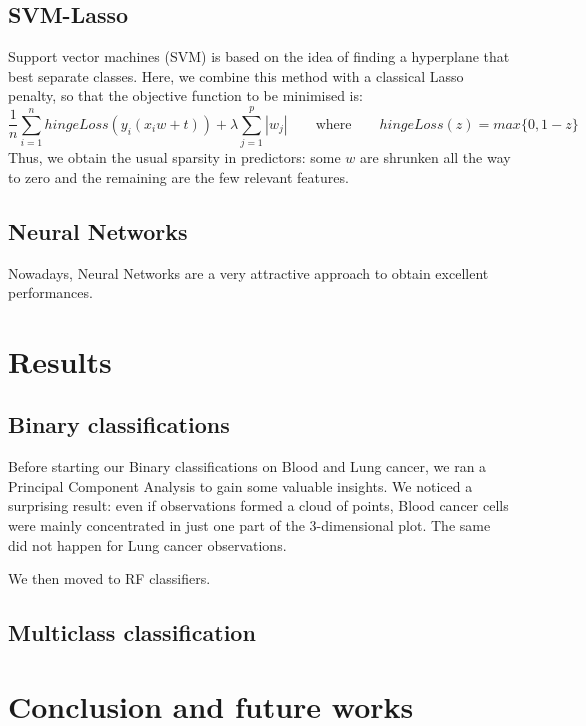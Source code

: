 \documentclass[a4paper,11pt, oneside]{article}  %
\begin{document}
\subsection{SVM-Lasso}
Support vector machines (SVM) is based on the idea of finding a hyperplane that best separate classes. Here, we combine this method with a classical Lasso penalty, so that the objective function to be minimised is:
\begin{equation*}
	\dfrac{1}{n} \sum_{i=1}^n hingeLoss(y_i(x_i w + t)) + \lambda \sum_{j=1}^p |w_j|  \qquad	\text{where} \qquad  hingeLoss(z) = max\{0, 1-z\}
\end{equation*}
Thus, we obtain the usual sparsity in predictors: some $w$ are shrunken all the way to zero and the remaining are the few relevant features.

\subsection{Neural Networks}
Nowadays, Neural Networks are a very attractive approach to obtain excellent performances.



\section{Results}
\subsection{Binary classifications}
Before starting our Binary classifications on Blood and Lung cancer, we ran a Principal Component Analysis to gain some valuable insights. We noticed a surprising result: even if observations formed a cloud of points, Blood cancer cells were mainly concentrated in just one part of the 3-dimensional plot. The same did not happen for Lung cancer observations.

We then moved to RF classifiers. 





\subsection{Multiclass classification}


\section{Conclusion and future works}


\end{document}
